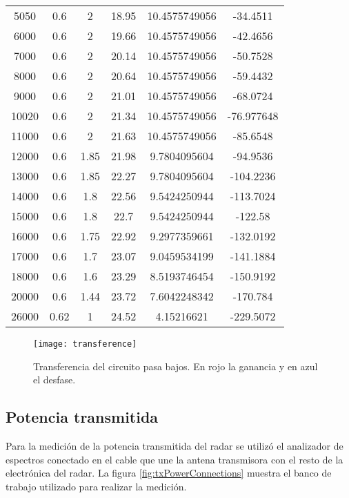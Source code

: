 \begin{table}[H]
\begin{tabular}{S[table-auto-round, table-format=5.2] *{2}{S[table-auto-round, table-format=1.2]} S[table-auto-round, table-format=-4.2] S[table-auto-round, table-format=2.1] S[table-auto-round, table-format=-3]}
  5050 & 0.6 & 2 & 18.95 & 10.4575749056 & -34.4511 \tabularnewline

  6000 & 0.6 & 2 & 19.66 & 10.4575749056 & -42.4656 \tabularnewline

  7000 & 0.6 & 2 & 20.14 & 10.4575749056 & -50.7528 \tabularnewline

  8000 & 0.6 & 2 & 20.64 & 10.4575749056 & -59.4432 \tabularnewline

  9000 & 0.6 & 2 & 21.01 & 10.4575749056 & -68.0724 \tabularnewline

  10020 & 0.6 & 2 & 21.34 & 10.4575749056 & -76.977648 \tabularnewline

  11000 & 0.6 & 2 & 21.63 & 10.4575749056 & -85.6548 \tabularnewline

  12000 & 0.6 & 1.85 & 21.98 & 9.7804095604 & -94.9536 \tabularnewline

  13000 & 0.6 & 1.85 & 22.27 & 9.7804095604 & -104.2236 \tabularnewline

  14000 & 0.6 & 1.8 & 22.56 & 9.5424250944 & -113.7024 \tabularnewline

  15000 & 0.6 & 1.8 & 22.7 & 9.5424250944 & -122.58 \tabularnewline

  16000 & 0.6 & 1.75 & 22.92 & 9.2977359661 & -132.0192 \tabularnewline

  17000 & 0.6 & 1.7 & 23.07 & 9.0459534199 & -141.1884 \tabularnewline

  18000 & 0.6 & 1.6 & 23.29 & 8.5193746454 & -150.9192 \tabularnewline

  20000 & 0.6 & 1.44 & 23.72 & 7.6042248342 & -170.784 \tabularnewline

  26000 & 0.62 & 1 & 24.52 & 4.15216621 & -229.5072 \tabularnewline
  \bottomrule
  \end{tabular}
\end{table}

\begin{figure}[H]
 \centering
 \texttt{[image: transference]}
 \caption{Transferencia del circuito pasa bajos. En rojo la ganancia y en azul el desfase.}
 \label{fig:lowPassFilterTransference}
\end{figure}


\subsection{Potencia transmitida}

Para la medición de la potencia transmitida del radar se utilizó el analizador de espectros conectado en el cable que une la antena transmisora con el resto de la electrónica del radar. La figura \ref{fig:txPowerConnections} muestra el banco de trabajo utilizado para realizar la medición.

